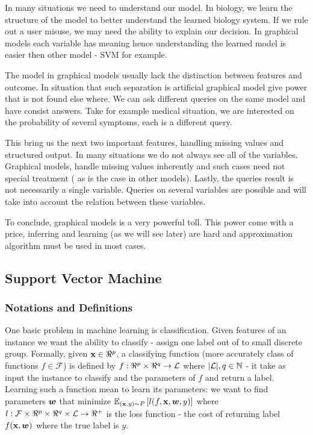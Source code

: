 In many situations we need to understand our model. In biology, we learn the structure of the model to better understand the learned biology system. If we rule out a user misuse, we may need the ability to explain our decision. In graphical models each variable has meaning hence understanding the learned model is easier then other model - SVM for example.

The model in graphical models usually lack the distinction between features and outcome. In situation that such separation is artificial graphical model give power that is not found else where. We can ask different queries on the same model and have consist answers. Take for example medical situation, we are interested on the probability of several symptoms, each is a different query.

This bring us the next two important features, handling missing values and structured output. In many situations we do not always see all of the variables. Graphical models, handle missing values inherently and such cases need not special treatment ( as is the case in other models). Lastly, the queries result is not necessarily a single variable. Queries on several variables are possible and will take into account the relation between these variables.

To conclude, graphical models is a very powerful toll. This power come with a price,  inferring and learning (as we will see later) are hard and approximation algorithm must be used in most cases.
\subsection{Support Vector Machine}
\subsubsection{Notations and Definitions}
One basic problem in machine learning is classification.
Given features of an instance we want the ability to classify - assign one label out of to small discrete group.
Formally, given ${\bf x} \in \Re^p$, a classifying function (more accurately class of functions $f \in \mathcal{F}$) is defined by $f: \Re^p \times \Re^q \to {\cal L}$ where $|{\cal L}|,q \in \mathbb{N}$  - it take as input the instance to classify and the parameters of $f$  and return a label.
Learning such a function mean to learn its parameters: we want to find parameters  $\boldsymbol{w}$ that minimize $\mathbb{E}_{({\bf x},y) \sim P}\left[{l(f,{\bf x}, \boldsymbol{w} ,y)}\right]$ where $l : \mathcal{F} \times\Re^p\times \Re^q \times {\cal L} \to \Re^{+}$ is the loss function - the cost of returning label $f({\bf x},\boldsymbol{w})$ where the true label is $y$.

